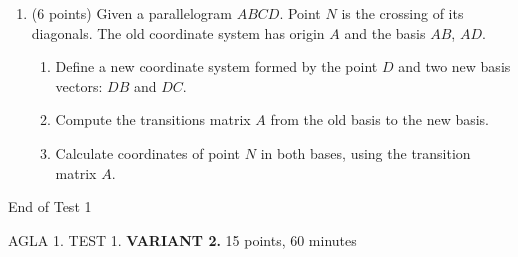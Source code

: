 \documentclass[]{exam}
\begin{document}
\begin{enumerate}
\item (6 points) Given a parallelogram $ABCD$. Point $N$ is the crossing of its diagonals. The old coordinate system has origin $A$ and the basis  $AB$, $AD$.

\begin{enumerate}
    \item Define a new coordinate system formed by the point $D$ and two new basis vectors: $DB$ and $DC$. 
    \item Compute the transitions matrix $A$ from the old basis to the new basis.
    \item Calculate coordinates of point $N$ in both bases, using the transition matrix $A$.
\end{enumerate}




\end{enumerate}

\begin{center}
    End of Test 1
\end{center}


\newpage 

AGLA 1. TEST 1. \textbf{VARIANT 2.} 15 points, 60 minutes
\bigskip







\end{document}

